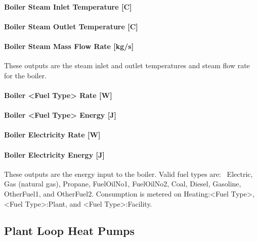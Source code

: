 \paragraph{Boiler Steam Inlet Temperature {[}C{]}}\label{boiler-steam-inlet-temperature-c}

\paragraph{Boiler Steam Outlet Temperature {[}C{]}}\label{boiler-steam-outlet-temperature-c}

\paragraph{Boiler Steam Mass Flow Rate {[}kg/s{]}}\label{boiler-steam-mass-flow-rate-kgs}

These outputs are the steam inlet and outlet temperatures and steam flow rate for the boiler.

\paragraph{Boiler \textless{}Fuel Type\textgreater{} Rate {[}W{]}}\label{boiler-fuel-type-rate-w-1}

\paragraph{Boiler \textless{}Fuel Type\textgreater{} Energy {[}J{]}}\label{boiler-fuel-type-energy-j-1}

\paragraph{Boiler Electricity Rate {[}W{]}}\label{boiler-electric-power-w-1}

\paragraph{Boiler Electricity Energy {[}J{]}}\label{boiler-electric-energy-j}

These outputs are the energy input to the boiler. Valid fuel types are:~ Electric, Gas (natural gas), Propane, FuelOilNo1, FuelOilNo2, Coal, Diesel, Gasoline, OtherFuel1, and OtherFuel2. Consumption is metered on Heating:\textless{}Fuel Type\textgreater{}, \textless{}Fuel Type\textgreater{}:Plant, and \textless{}Fuel Type\textgreater{}:Facility.

\subsection{Plant Loop Heat Pumps}\label{plant-loop-heat-pumps}

